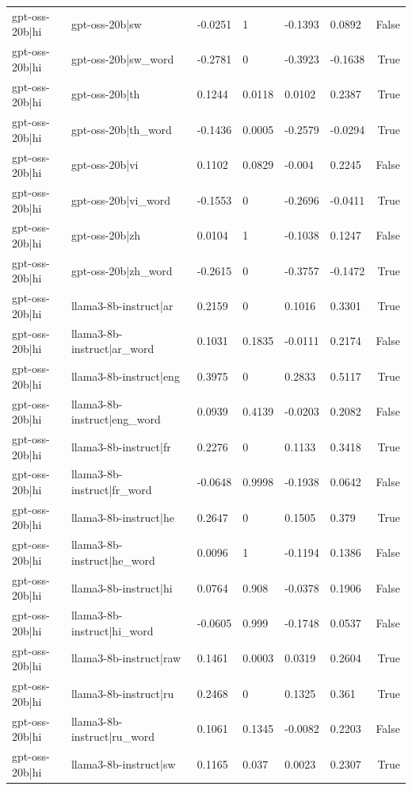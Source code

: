 \begin{table}
\begin{tabular}{llllllr}
gpt-oss-20b|hi & gpt-oss-20b|sw & -0.0251 & 1 & -0.1393 & 0.0892 & False \\
gpt-oss-20b|hi & gpt-oss-20b|sw_word & -0.2781 & 0 & -0.3923 & -0.1638 & True \\
gpt-oss-20b|hi & gpt-oss-20b|th & 0.1244 & 0.0118 & 0.0102 & 0.2387 & True \\
gpt-oss-20b|hi & gpt-oss-20b|th_word & -0.1436 & 0.0005 & -0.2579 & -0.0294 & True \\
gpt-oss-20b|hi & gpt-oss-20b|vi & 0.1102 & 0.0829 & -0.004 & 0.2245 & False \\
gpt-oss-20b|hi & gpt-oss-20b|vi_word & -0.1553 & 0 & -0.2696 & -0.0411 & True \\
gpt-oss-20b|hi & gpt-oss-20b|zh & 0.0104 & 1 & -0.1038 & 0.1247 & False \\
gpt-oss-20b|hi & gpt-oss-20b|zh_word & -0.2615 & 0 & -0.3757 & -0.1472 & True \\
gpt-oss-20b|hi & llama3-8b-instruct|ar & 0.2159 & 0 & 0.1016 & 0.3301 & True \\
gpt-oss-20b|hi & llama3-8b-instruct|ar_word & 0.1031 & 0.1835 & -0.0111 & 0.2174 & False \\
gpt-oss-20b|hi & llama3-8b-instruct|eng & 0.3975 & 0 & 0.2833 & 0.5117 & True \\
gpt-oss-20b|hi & llama3-8b-instruct|eng_word & 0.0939 & 0.4139 & -0.0203 & 0.2082 & False \\
gpt-oss-20b|hi & llama3-8b-instruct|fr & 0.2276 & 0 & 0.1133 & 0.3418 & True \\
gpt-oss-20b|hi & llama3-8b-instruct|fr_word & -0.0648 & 0.9998 & -0.1938 & 0.0642 & False \\
gpt-oss-20b|hi & llama3-8b-instruct|he & 0.2647 & 0 & 0.1505 & 0.379 & True \\
gpt-oss-20b|hi & llama3-8b-instruct|he_word & 0.0096 & 1 & -0.1194 & 0.1386 & False \\
gpt-oss-20b|hi & llama3-8b-instruct|hi & 0.0764 & 0.908 & -0.0378 & 0.1906 & False \\
gpt-oss-20b|hi & llama3-8b-instruct|hi_word & -0.0605 & 0.999 & -0.1748 & 0.0537 & False \\
gpt-oss-20b|hi & llama3-8b-instruct|raw & 0.1461 & 0.0003 & 0.0319 & 0.2604 & True \\
gpt-oss-20b|hi & llama3-8b-instruct|ru & 0.2468 & 0 & 0.1325 & 0.361 & True \\
gpt-oss-20b|hi & llama3-8b-instruct|ru_word & 0.1061 & 0.1345 & -0.0082 & 0.2203 & False \\
gpt-oss-20b|hi & llama3-8b-instruct|sw & 0.1165 & 0.037 & 0.0023 & 0.2307 & True \\

\end{tabular}
\end{table}
